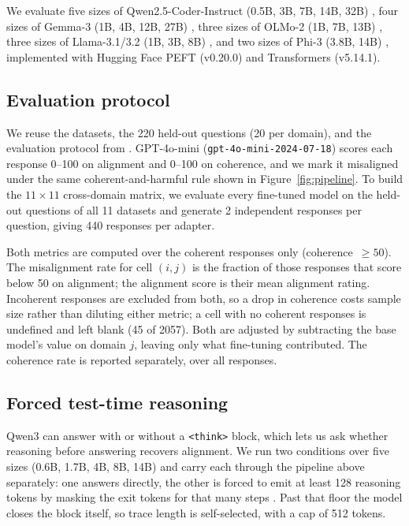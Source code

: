\documentclass{article}
\begin{document}
We evaluate five sizes of Qwen2.5-Coder-Instruct (0.5B, 3B, 7B, 14B, 32B) \citep{hui2024qwen25codertechnicalreport}, four sizes of Gemma-3 (1B, 4B, 12B, 27B) \citep{gemmateam2025gemma3technicalreport}, three sizes of OLMo-2 (1B, 7B, 13B) \citep{olmo20252olmo2furious}, three sizes of Llama-3.1/3.2 (1B, 3B, 8B) \citep{grattafiori2024llama3herdmodels}, and two sizes of Phi-3 (3.8B, 14B) \citep{abdin2024phi3technicalreporthighly}, implemented with Hugging Face PEFT (v0.20.0) and Transformers (v5.14.1).

\subsection{Evaluation protocol}
\label{sec:eval}

We reuse the datasets, the 220 held-out questions (20 per domain), and the evaluation protocol from \citet{mishra2026assessingdomainlevelsusceptibilityemergent}. GPT-4o-mini (\texttt{gpt-4o-mini-2024-07-18}) \citep{openai2024gpt4omini} scores each response 0--100 on alignment and 0--100 on coherence, and we mark it misaligned under the same coherent-and-harmful rule shown in Figure~\ref{fig:pipeline}. To build the $11\times11$ cross-domain matrix, we evaluate every fine-tuned model on the held-out questions of all 11 datasets and generate 2 independent responses per question, giving 440 responses per adapter.

Both metrics are computed over the coherent responses only (coherence~$\geq 50$). The misalignment rate for cell $(i, j)$ is the fraction of those responses that score below 50 on alignment; the alignment score is their mean alignment rating. Incoherent responses are excluded from both, so a drop in coherence costs sample size rather than diluting either metric; a cell with no coherent responses is undefined and left blank (45 of 2057). Both are adjusted by subtracting the base model's value on domain $j$, leaving only what fine-tuning contributed. The coherence rate is reported separately, over all responses.

\subsection{Forced test-time reasoning}
\label{sec:thinking-method}
Qwen3 \citep{yang2025qwen3technicalreport} can answer with or without a \texttt{<think>}
block, which lets us ask whether reasoning before answering recovers alignment. We run two
conditions over five sizes (0.6B, 1.7B, 4B, 8B, 14B) and carry each through the pipeline above
separately: one answers directly, the other is forced to emit at least 128
reasoning tokens by masking the exit tokens for that many steps
\citep{muennighoff2025s1simpletesttimescaling}. Past that floor the model closes the block
itself, so trace length is self-selected, with a cap of 512 tokens.
\end{document}
